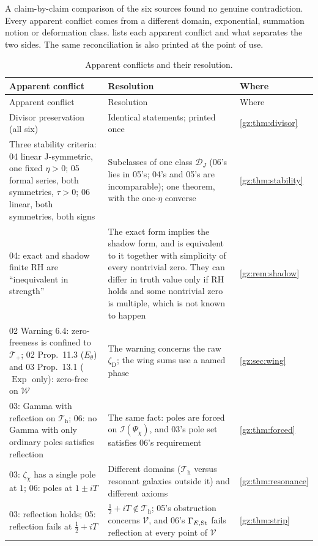 \documentclass[11pt,a4paper]{article}
\numberwithin{equation}{section}
\theoremstyle{definition}
\theoremstyle{remark}
\newcommand{\Exp}{\operatorname{Exp}}
\newcommand{\cI}{\mathcal I}
\newcommand{\zD}{\zeta_{\mathrm D}}
\newcommand{\Tp}{\mathcal T_{+}}
\newcommand{\Th}{\mathcal T_{\mathrm h}}
\newcommand{\Wing}{\mathcal W}
\newcommand{\Vs}{\mathcal V}
\newcommand{\DJs}{\mathcal D_{J}}
\begin{document}
A claim-by-claim comparison of the six sources found no genuine
contradiction. Every apparent conflict comes from a different domain,
exponential, summation notion or deformation class. 
lists each apparent conflict and what separates the two sides. The same
reconciliation is also printed at the point of use.
\begin{center}\small
\begin{longtable}{@{}P{0.30\textwidth}P{0.44\textwidth}P{0.18\textwidth}@{}}
\caption{Apparent conflicts and their resolution.}\label{gz:tab:fit}\\
\toprule
Apparent conflict & Resolution & Where\\
\midrule
\endfirsthead
\toprule
Apparent conflict & Resolution & Where\\
\midrule
\endhead
Divisor preservation (all six) & Identical statements; printed once & \cref{gz:thm:divisor}\\
Three stability criteria: 04 linear J-symmetric, one fixed $\eta>0$; 05 formal series, both symmetries, $\tau>0$; 06 linear, both symmetries, both signs & Subclasses of one class $\DJs$ (06's lies in 05's; 04's and 05's are incomparable); one theorem, with the one-$\eta$ converse & \cref{gz:thm:stability}\\
04: exact and shadow finite RH are ``inequivalent in strength'' & The exact form implies the shadow form, and is equivalent to it together with simplicity of every nontrivial zero. They can differ in truth value only if RH holds and some nontrivial zero is multiple, which is not known to happen & \cref{gz:rem:shadow}\\
02 Warning 6.4: zero-freeness is confined to $\Tp$; 02 Prop.\ 11.3 ($E_\theta$) and 03 Prop.\ 13.1 ($\Exp$ only): zero-free on $\Wing$ & The warning concerns the raw $\zD$; the wing sums use a named phase & \cref{gz:sec:wing}\\
03: Gamma with reflection on $\Th$; 06: no Gamma with only ordinary poles satisfies reflection & The same fact: poles are forced on $\cI(\Psi_\chi)$, and 03's pole set satisfies 06's requirement & \cref{gz:thm:forced}\\
03: $\zeta_\chi$ has a single pole at $1$; 06: poles at $1\pm iT$ & Different domains ($\Th$ versus resonant galaxies outside it) and different axioms & \cref{gz:thm:resonance}\\
03: reflection holds; 05: reflection fails at $\tfrac12+iT$ & $\tfrac12+iT\notin\Th$; 05's obstruction concerns $\Vs$, and 06's $\Gamma_{E,\rm St}$ fails reflection at every point of $\Vs$ & \cref{gz:thm:strip}\\

\end{longtable}
\end{center}
\end{document}
